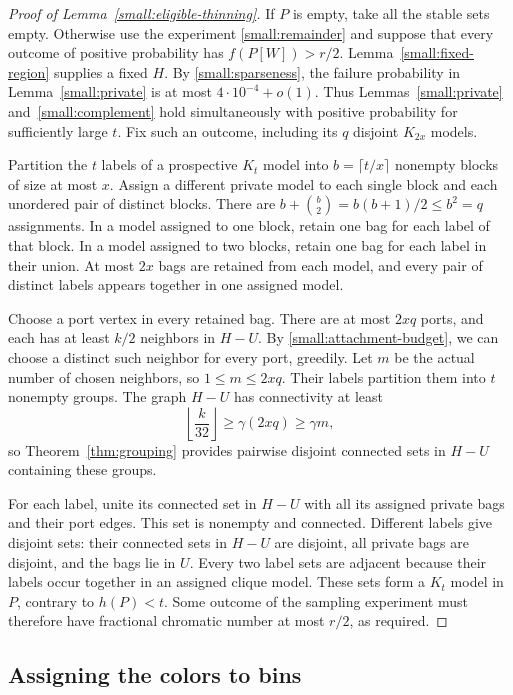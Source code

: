\begin{proof}[Proof of Lemma~\ref{small:eligible-thinning}]
If $P$ is empty, take all the stable sets empty. Otherwise use the
experiment \eqref{small:remainder} and suppose that every outcome of
positive probability has $f(P[W])>r/2$.
Lemma~\ref{small:fixed-region} supplies a fixed $H$. By
\eqref{small:sparseness}, the failure probability in
Lemma~\ref{small:private} is at most $4\cdot10^{-4}+o(1)$.
Thus Lemmas~\ref{small:private} and~\ref{small:complement} hold
simultaneously with positive probability for sufficiently large $t$.
Fix such an outcome, including its $q$ disjoint $K_{2x}$ models.

Partition the $t$ labels of a prospective $K_t$ model into
$b=\lceil t/x\rceil$ nonempty blocks of size at most $x$. Assign a
different private model to each single block and each unordered pair
of distinct blocks. There are
$b+\binom b2=b(b+1)/2\le b^2=q$ assignments. In a model assigned to
one block, retain one bag for each label of that block. In a model
assigned to two blocks, retain one bag for each label in their union.
At most $2x$ bags are retained from each model, and every pair of
distinct labels appears together in one assigned model.

Choose a port vertex in every retained bag. There are at most $2xq$
ports, and each has at least $k/2$ neighbors in $H-U$. By
\eqref{small:attachment-budget}, we can choose a distinct such neighbor
for every port, greedily. Let $m$ be the actual number of chosen
neighbors, so $1\le m\le2xq$. Their labels partition them into $t$
nonempty groups. The graph $H-U$ has connectivity at least
\[
 \left\lfloor\frac{k}{32}\right\rfloor
 \ge\gamma(2xq)\ge\gamma m,
\]
so Theorem~\ref{thm:grouping} provides pairwise disjoint connected sets
in $H-U$ containing these groups.

For each label, unite its connected set in $H-U$ with all its assigned
private bags and their port edges. This set is nonempty and connected.
Different labels give disjoint sets: their connected sets in $H-U$
are disjoint, all private bags are disjoint, and the bags lie in $U$.
Every two label sets are adjacent because their labels occur together
in an assigned clique model. These sets form a $K_t$ model in $P$,
contrary to $h(P)<t$. Some outcome of the sampling experiment must
therefore have fractional chromatic number at most $r/2$, as required.
\end{proof}

\subsection{Assigning the colors to bins}

